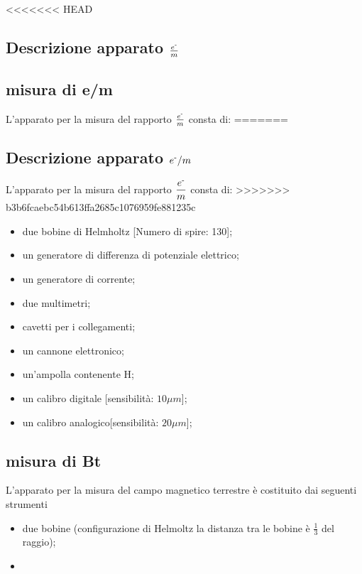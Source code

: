 <<<<<<< HEAD
\subsection{Descrizione apparato $\frac{e^{\textrm{-}}}{m}$}
\subsection{misura di e/m}
L'apparato per la misura del rapporto $\frac{e^{\textrm{-}}}{m}$ consta di:
=======
\subsection{Descrizione apparato $e^{\textrm{-}}/m$}
L'apparato per la misura del rapporto $\dfrac{e^{\textrm{-}}}{m}$ consta di:
>>>>>>> b3b6fcaebc54b613ffa2685c1076959fe881235c
\begin{itemize}
  \item due bobine di Helmholtz [Numero di spire: 130];
  \item un generatore di differenza di potenziale elettrico;
  \item un generatore di corrente;
  \item due multimetri;
  \item cavetti per i collegamenti;
  \item un cannone elettronico;
  \item un'ampolla contenente H;
  \item un calibro digitale [sensibilità: $10\mu m$];
  \item un calibro analogico[sensibilità: $20\mu m$];
\end{itemize}

\subsection{misura di Bt}
L'apparato per la misura del campo magnetico terrestre è costituito dai seguenti strumenti
\begin{itemize}
  \item due bobine (configurazione di Helmoltz la distanza tra le bobine è $\frac{1}{3}$ del raggio);
  \item 
\end{itemize}
